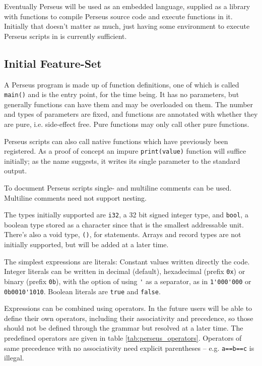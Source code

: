     	Eventually Perseus will be used as an embedded language, supplied as a library with functions to compile Perseus source code and execute functions in it. Initially that doesn't matter as much, just having some environment to execute Perseus scripts in is currently sufficient.
    	
    	\subsection{Initial Feature-Set}
    	
			A Perseus program is made up of function definitions, one of which is called \lstinline$main()$ and is the entry point, for the time being. It has no parameters, but generally functions can have them and may be overloaded on them. The number and types of parameters are fixed, and functions are annotated with whether they are pure, i.e. side-effect free. Pure functions may only call other pure functions.
			
			Perseus scripts can also call native functions which have previously been registered. As a proof of concept an impure \lstinline$print(value)$ function will suffice initially; as the name suggests, it writes its single parameter to the standard output.
			
			To document Perseus scripts single- and multiline comments can be used. Multiline comments need not support nesting.
			
			The types initially supported are \lstinline$i32$, a 32 bit signed integer type, and \lstinline$bool$, a boolean type stored as a character since that is the smallest addressable unit. There's also a void type, \lstinline$()$, for statements. Arrays and record types are not initially supported, but will be added at a later time.
	    	
	    	The simplest expressions are literals: Constant values written directly the code. Integer literals can be written in decimal (default), hexadecimal (prefix \lstinline$0x$) or binary (prefix \lstinline$0b$), with the option of using \lstinline$'$ as a separator, as in \lstinline$1'000'000$ or \lstinline$0b0010'1010$. Boolean literals are \lstinline$true$ and \lstinline$false$.
	    	
	    	Expressions can be combined using operators. In the future users will be able to define their own operators, including their associativity and precedence, so those should not be defined through the grammar but resolved at a later time. The predefined operators are given in table \ref{tab:perseus_operators}. Operators of same precedence with no associativity need explicit parentheses -- e.g. \lstinline$a==b==c$ is illegal.
	    	
